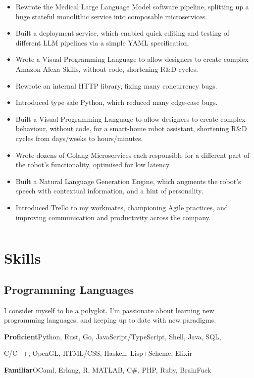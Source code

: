 \documentclass{jcgcv}
\begin{document}
\begin{column}
  \begin{itemize}
    \item Rewrote the Medical Large Language Model software pipeline, splitting
          up a huge stateful monolithic service into composable microservices.
    \item Built a deployment service, which enabled quick editing and testing of
          different LLM pipelines via a simple YAML specification.
    \item Wrote a Visual Programming Language to allow designers to create
          complex Amazon Alexa Skills, without code, shortening R\&D cycles.
    \item Rewrote an internal HTTP library, fixing many concurrency bugs.
    \item Introduced type safe Python, which reduced many edge-case bugs.
  \end{itemize}

  \begin{itemize}
    \item Built a Visual Programming Language to allow designers to create
          complex behaviour, without code, for a smart-home robot assistant,
          shortening R\&D cycles from days/weeks to hours/minutes.
    \item Wrote dozens of Golang Microservices each responsible for a different
          part of the robot's functionality, optimised for low latency.
    \item Built a Natural Language Generation Engine, which augments the
          robot's speech with contextual information, and a hint of personality.
    \item Introduced Trello to my workmates, championing Agile practices, and
          improving communication and productivity across the company.
  \end{itemize}

\end{column}\begin{column}

\section{Skills}
  \subsection{Programming Languages}
    I consider myself to be a polyglot. I'm passionate about learning
    new programming languages, and keeping up to date with new paradigms.
    \par\textbf{Proficient}\hspace{0.4em}Python, Rust, Go, JavaScript/TypeScript, Shell, Java, SQL,
      \par\hspace{4.95em}C/C++, OpenGL, HTML/CSS, Haskell, Lisp+Scheme, Elixir
    \par\textbf{Familiar}\hspace{1.1em}OCaml, Erlang, R, MATLAB, C\#, PHP, Ruby, BrainFuck

\end{column}
\end{document}
